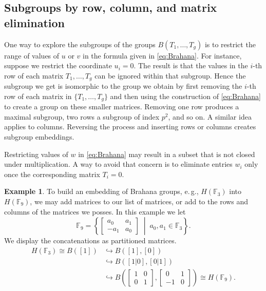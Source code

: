 \documentclass[11pt]{article}
\numberwithin{equation}{section}
\theoremstyle{definition}
\theoremstyle{plain}
\newcommand{\eg}{e.\,g.}
\numberwithin{equation}{section}
\theoremstyle{plain}       %
\theoremstyle{remark}
\theoremstyle{definition}
\newtheorem{ex}[equation]{Example}  %
\numberwithin{figure}{section}
\numberwithin{table}{section}
\newcommand{\bbF}{\mathbb{F}}  %
\begin{document}
\subsection{Subgroups by row, column, and matrix elimination}
One way to explore the subgroups of the groups $B(T_1,\dots,T_g)$ is to restrict
the range of values of $u$ or $v$ in the formula given in \eqref{eq:Brahana}.
For instance, suppose we restrict the coordinate $u_i=0$.  The result is that
the values in the $i$-th row of each matrix $T_1, \dots, T_g$ can be ignored
within that subgroup.  Hence the subgroup we get is isomorphic to the group we
obtain by first removing the $i$-th row of each matrix in $\{T_1,\dots,T_g\}$
and then using the construction of \eqref{eq:Brahana} to create a group on these
smaller matrices.  Removing one row produces a maximal subgroup, two rows a
subgroup of index $p^2$, and so on.  A similar idea applies to columns.
Reversing the process and inserting rows or columns creates subgroup embeddings.

Restricting values of $w$ in \eqref{eq:Brahana} may result in a subset that is
not closed under multiplication.  A way to avoid that concern is to eliminate
entries $w_i$ only once the corresponding matrix $T_i=0$.  

\begin{ex}
To build an embedding of Brahana groups, \eg, $H(\bbF_3)$ into $H(\bbF_{9})$, we
may add matrices to our list of matrices, or  add to the rows and columns of the
matrices we posses.  In this example we let
\[
  \bbF_9=\left\{ \begin{bmatrix} a_0
      & a_1\\ -a_1 & a_0\end{bmatrix}\;\middle|\; a_0,a_1\in \bbF_3\right\}.
\]
We display the concatenations as partitioned matrices.
\begin{align*}
	H(\bbF_3)  \cong B([1]) & \hookrightarrow B([1],[0]) \\
		& \hookrightarrow B([1 | 0],[0 | 1]) \\
		& \hookrightarrow B\left(
			\begin{bmatrix}
			 1 & 0 \\
			 \hline 
			0 & 1 
			\end{bmatrix},
			\begin{bmatrix} 
			0 & 1 \\ 
			\hline 
			-1 & 0 
			\end{bmatrix}\right)
			\cong H(\bbF_{9}).
\end{align*}
\end{ex}
\end{document}

